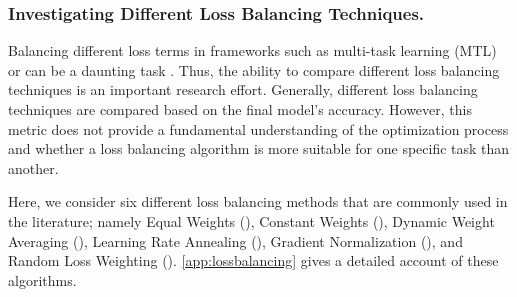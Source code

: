 \documentclass[letterpaper]{article} %
\begin{document}
           \subsubsection{Investigating Different Loss Balancing Techniques.} \label{sss:MTL}
           Balancing different loss terms in frameworks such as multi-task learning (MTL) or \SGML{} can be a daunting task \cite{wang2020and,doi:10.1137/20M1318043,elhamod2022cophy}. Thus, the ability to compare different loss balancing techniques is an important research effort. Generally, different loss balancing techniques are compared based on the final model's accuracy. 
           However, this metric 
           does not provide a fundamental understanding of the optimization process 
           and whether a loss balancing algorithm is more suitable for one specific task than another. %

           Here, we consider six different loss balancing methods that are commonly used in the literature; namely Equal Weights (\ew{}), Constant Weights (\cw{}), Dynamic Weight Averaging (\dwa{}), Learning Rate Annealing \cite{doi:10.1137/20M1318043} (\lranneal{}), Gradient Normalization \cite{pmlr-v80-chen18a} (\gradnorm{}), and Random Loss Weighting \cite{lin2022reasonable}  (\rlw{}). 
           \cref{app:lossbalancing} gives a detailed account of these algorithms.
           
\end{document}
